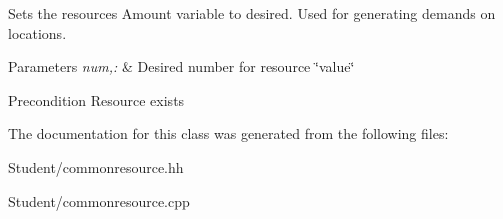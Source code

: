 Sets the resources Amount variable to desired. Used for generating demands on locations. 


\begin{DoxyParams}{Parameters}
{\em num,\-:} & Desired number for resource \char`\"{}value\char`\"{} \\
\hline
\end{DoxyParams}
\begin{DoxyPrecond}{Precondition}
Resource exists 
\end{DoxyPrecond}


The documentation for this class was generated from the following files\-:\begin{DoxyCompactItemize}
\item 
Student/commonresource.\-hh\item 
Student/commonresource.\-cpp\end{DoxyCompactItemize}
